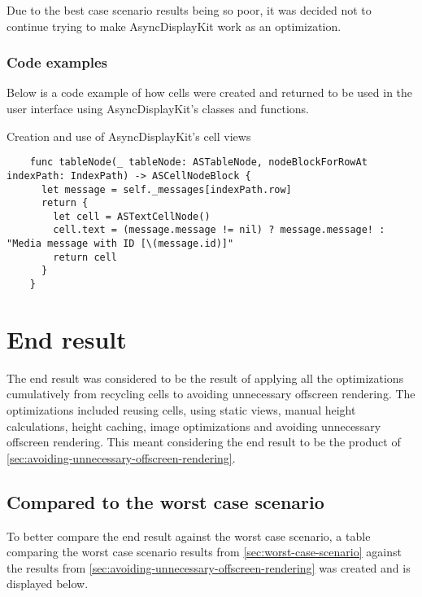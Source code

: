 \documentclass[a4paper,12pt]{article}
\begin{document}
Due to the best case scenario results being so poor, it was decided not to continue trying to make AsyncDisplayKit work as an optimization.

\subsubsection{Code examples}
Below is a code example of how cells were created and returned to be used in the user interface using AsyncDisplayKit's classes and functions.
\begin{listing}[H]
  \caption{Creation and use of AsyncDisplayKit's cell views}
  \begin{verbatim}
    func tableNode(_ tableNode: ASTableNode, nodeBlockForRowAt indexPath: IndexPath) -> ASCellNodeBlock {
      let message = self._messages[indexPath.row]
      return {
        let cell = ASTextCellNode()
        cell.text = (message.message != nil) ? message.message! : "Media message with ID [\(message.id)]"
        return cell
      }
    }
  \end{verbatim}
\end{listing}

\newpage
\section{End result}
The end result was considered to be the result of applying all the optimizations cumulatively from recycling cells to avoiding unnecessary offscreen rendering. The optimizations included reusing cells, using static views, manual height calculations, height caching, image optimizations and avoiding unnecessary offscreen rendering. This meant considering the end result to be the product of \autoref{sec:avoiding-unnecessary-offscreen-rendering}.

\subsection{Compared to the worst case scenario}
To better compare the end result against the worst case scenario, a table comparing the worst case scenario results from \autoref{sec:worst-case-scenario} against the results from \autoref{sec:avoiding-unnecessary-offscreen-rendering} was created and is displayed below.
\end{document}
